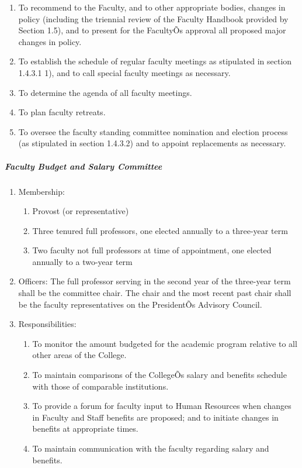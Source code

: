 \documentclass[letterpaper, 11pt]{article}
\begin{document}
\begin{enumerate}[label=\alph*)]
{\begin{enumerate}[label=\arabic*)]
								\item{To recommend to the Faculty, and to other appropriate bodies, changes in policy (including the triennial review of the Faculty Handbook provided by Section 1.5), and to present for the FacultyÕs approval all proposed major changes in policy.}
								\item{To establish the schedule of regular faculty meetings as stipulated in section 1.4.3.1 1), and to call special faculty meetings as necessary.}
								\item{To determine the agenda of all faculty meetings.}
								\item{To plan faculty retreats.}
								\item{To oversee the faculty standing committee nomination and election process (as stipulated in section 1.4.3.2)  and to appoint replacements as necessary.}
							\end{enumerate}
						}
					\end{enumerate}
				\subparagraph{  Faculty Budget and Salary Committee}
					\begin{enumerate}[label=\alph*)]
						\item{Membership:
							\begin{enumerate}[label=\arabic*)]
								\item{Provost (or representative)}
								\item{Three tenured full professors, one elected annually to a three-year term}
								\item{Two faculty not full professors at time of appointment, one elected annually to a two-year term}
							\end{enumerate}
						}
						\item{Officers:
							The full professor serving in the second year of the three-year term shall be the committee chair.  The chair and the most recent past chair shall be the faculty representatives on the PresidentÕs Advisory Council.
						}
						\item{Responsibilities:
							\begin{enumerate}[label=\arabic*)]
								\item{To monitor the amount budgeted for the academic program relative to all other areas of the College.}
								\item{To maintain comparisons of the CollegeÕs salary and benefits schedule with those of comparable institutions.}
								\item{To provide a forum for faculty input to Human Resources when changes in Faculty and Staff benefits are proposed; and to initiate changes in benefits at appropriate times.}
								\item{To maintain communication with the faculty regarding salary and benefits.}
							\end{enumerate}
						}
					\end{enumerate}
\end{document}
